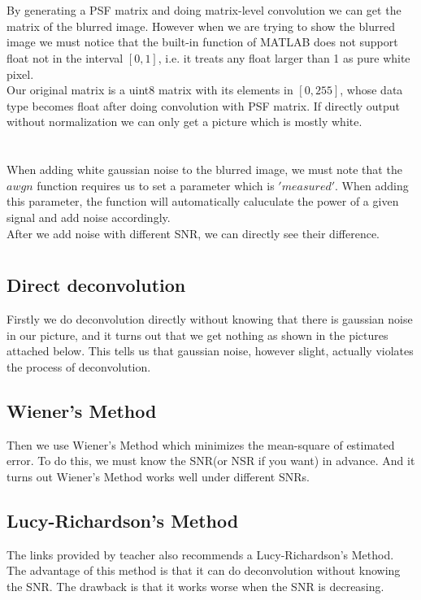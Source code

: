 \documentclass[12pt,letterpaper]{article}
\begin{document}
\section{}
By generating a PSF matrix and doing matrix-level convolution we can get the matrix of the blurred image. However when we are trying to 
show the blurred image we must notice that the built-in function of MATLAB does not support float not in the interval
$[0,1]$, i.e. it treats any float larger than 1 as pure white pixel. 
\\
Our original matrix is a uint8 matrix with its elements in $[0,255]$, whose data type becomes float after doing
convolution with PSF matrix. If directly output without normalization we can only get a picture which is mostly white.
\section{}
When adding white gaussian noise to the blurred image, we must note that the $awgn$ function requires us to set a parameter which is 
$'measured'$.  When adding this parameter, the function will automatically caluculate the 
power of a given signal and add noise accordingly.\\
After we add noise with different SNR, we can directly see their difference.
\section{}
\subsection{Direct deconvolution}
Firstly we do deconvolution directly without knowing that there is gaussian noise in our picture,
and it turns out that we get nothing as shown in the pictures attached below. This tells us that 
gaussian noise, however slight, actually violates the process of deconvolution. 
\subsection{Wiener's Method}
Then we use Wiener's Method which minimizes the mean-square of estimated error. To do this, we must know the SNR(or NSR if you want) in advance.
And it turns out Wiener's Method works well under different SNRs.
\subsection{Lucy-Richardson's Method}
The links provided by teacher also recommends a Lucy-Richardson's Method. The advantage of this method is that it can do deconvolution without knowing the SNR.
The drawback is that it works worse when the SNR is decreasing. 
\end{document}

